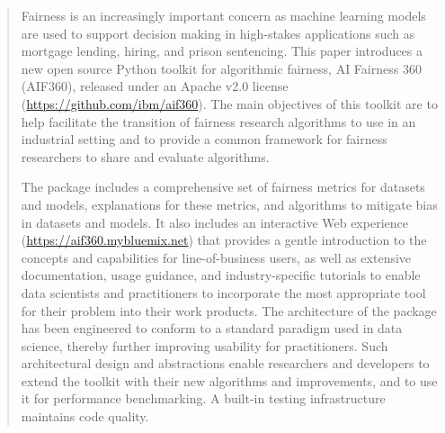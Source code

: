 \documentclass{article}
\begin{document}
\begin{abstract}
Fairness is an increasingly important concern as machine learning models are used to support decision making in high-stakes applications such as mortgage lending, hiring, and prison sentencing.  
This paper introduces a new open source Python toolkit for algorithmic fairness, AI Fairness 360 (AIF360), released under an Apache v2.0 license (\url{https://github.com/ibm/aif360}). 
The main objectives of this toolkit are to help facilitate
the transition of fairness research algorithms to use in an industrial setting
and to provide a common framework
for fairness researchers to share and evaluate algorithms.

The package includes a comprehensive set of fairness metrics for datasets and models, explanations for these metrics, and algorithms to mitigate bias in datasets and models.
It also includes an interactive Web experience
(\url{https://aif360.mybluemix.net}) 
that provides a gentle introduction to the concepts and capabilities for line-of-business users,
as well as extensive documentation, usage guidance, and industry-specific tutorials to enable data scientists and practitioners to incorporate the most appropriate tool for their problem into their work products. The architecture of the package has been engineered to conform to a standard paradigm used in data science, thereby further improving usability for practitioners.  Such architectural design and abstractions enable
researchers and developers to extend the toolkit with their new algorithms and improvements, and to use it for performance benchmarking. A built-in testing infrastructure maintains code quality.




\end{abstract}
\end{document}
